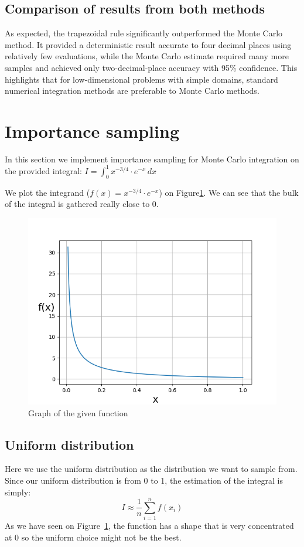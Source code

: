 \documentclass[9pt]{IEEEtran}
\begin{document}
 \subsection{Comparison of results from both methods}
As expected, the trapezoidal rule significantly outperformed the Monte Carlo
 method. It provided a deterministic result accurate to four decimal places 
 using relatively few evaluations, while the Monte Carlo estimate required 
 many more samples and achieved only two-decimal-place accuracy with 95\%
  confidence. This highlights that for low-dimensional problems with simple
   domains, standard numerical integration methods are preferable to Monte 
   Carlo methods.

\section{Importance sampling}
In this section we implement importance sampling for Monte Carlo integration
 on the provided integral:
 $I = \int_0^1 x^{-3/4} \cdot e^{-x} \, dx$

We plot the integrand ($f(x) = x^{-3/4} \cdot e^{-x}$) on Figure\ref{fig:lin}. We can see that 
the bulk of the integral is gathered really close to 0.


    \begin{figure}[h]
        \centering
        \includegraphics[width=0.99\columnwidth]{figures/f}
        \caption{Graph of the given function}
        \label{fig:lin}
    \end{figure}

 \subsection{Uniform distribution}
 Here we use the uniform distribution as the distribution we want to sample from.
 Since our uniform distribution is from 0 to 1, the estimation of the integral is
 simply: 
 \[
I \approx \frac{1}{n} \sum_{i=1}^{n} f(x_i)
\]
As we have seen on Figure~\ref{fig:lin}, the function has a shape that is very concentrated at 
0 so the uniform choice might not be the best. 
\end{document}
